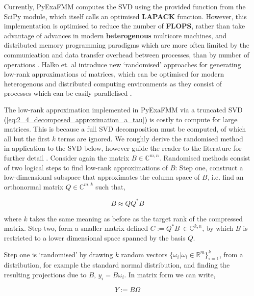 Currently, \gls{PyExaFMM} computes the \gls{SVD} using the provided function
from the SciPy module, which itself calls an optimised \textbf{\gls{LAPACK}}
function. However, this implementation is optimised to reduce the number
of \textbf{\gls{FLOPS}}, rather than take advantage of advances in modern
\textbf{\gls{heterogenous}} multicore machines, and
distributed memory programming paradigms which are more often limited by the
communication and data transfer overhead between processes, than by number of
operations \cite{Halko:2011:SIAM}. Halko et. al introduce new `randomised'
approaches for generating low-rank approximations of matrices, which can be
optimised for modern heterogenous and distributed computing environments as they
consist of processes which can be easily parallelised \cite{Halko:2011:SIAM}.

The low-rank approximation implemented in \gls{PyExaFMM} via a truncated
\gls{SVD} (\ref{eq:2_4_decomposed_approximation_a_tau}) is costly to compute
for large matrices. This is because a full \gls{SVD} decomposition must be computed, of
which all but the first $k$ terms are ignored.
We roughly derive the randomised method in application to the \gls{SVD} below, however guide
the reader to the literature for further detail \cite{Erichson:2019:JOSS,Halko:2011:SIAM}.
Consider again the matrix $B \in \mathbb{C}^{m, n}$. Randomised methods consist
of two logical steps to find low-rank approximations of $B$: Step one, construct
a low-dimensional subspace that approximates the column space of $B$, i.e.
find an orthonormal matrix $Q \in \mathbb{C}^{m, k}$ such that,

\begin{equation}
    B \approx QQ^*B
    \label{eq:2_4_step_1_randomised}
\end{equation}

where $k$ takes the same meaning as before as the target rank of the compressed
matrix. Step two, form a smaller matrix defined $C := Q^*B \> \in \mathbb{C}^{k, n}$,
by which $B$ is restricted to a lower dimensional space spanned by the basis
$Q$.

Step one is `randomised' by drawing $k$ random vectors $\{ \omega_i | \omega_i \in \mathbb{R}^m \}_{i=1}^k$,
from a distribution, for example the standard normal distribution, and finding the
resulting projections due to $B$, $y_i = B \omega_i$. In matrix form we can write,

\begin{equation}
    Y := B \Omega
\end{equation}

